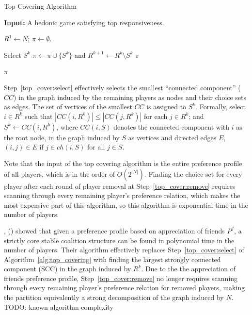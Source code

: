 \documentclass[letterpaper]{article} %
\newcommand{\citename}[1]{\citeauthor{#1}, (\citeyear{#1})}
\theoremstyle{definition}
\begin{document}
\begin{algorithm}[htb]
  \caption{Top Covering Algorithm}
  \label{alg:top_covering}
  \textbf{Input:} A hedonic game satisfying top responsiveness.

  \begin{algorithmic}[1]
  \State $R^1 \leftarrow N$; $\pi \leftarrow \emptyset$.

    \State \label{top_cover:select} Select $S^k$
    \State \label{top_cover:remove} $\pi \leftarrow \pi \cup \lbrace S^k \rbrace$ and $R^{k+1} \leftarrow  R^k \setminus S^k$
      \State \Return $\pi$
    \EndIf
  \EndFor

  \State \Return $\pi$
 \end{algorithmic}
\end{algorithm}

Step~\ref{top_cover:select} effectively selects the smallest ``connected component'' ($CC$) in the graph induced by the remaining players as nodes and their choice sets as edges. The set of vertices of the smallest $CC$ is assigned to $S^k$. Formally, select $i\in R^k$ such that $|CC(i,R^k)| \leq |CC(j,R^k)|$ for each $j\in R^k$; and $S^k\leftarrow CC(i,R^k)$, where $CC(i, S)$ denotes the connected component with $i$ as the root node, in the graph induced by $S$ as vertices and directed edges $E$, $(i, j) \in E$ if $j \in ch(i, S)$ for all $j \in S$.

Note that the input of the top covering algorithm is the entire preference profile of all players, which is in the order of $O(2^{|N|})$. Finding the choice set for every player after each round of player removal at Step~\ref{top_cover:remove} requires scanning through every remaining player's preference relation, which makes the most expensive part of this algorithm, so this algorithm is exponential time in the number of players.

\citename{Dimitrov2006} showed that given a preference profile based on appreciation of friends $P^f$, a strictly core stable coalition structure can be found in polynomial time in the number of players. Their algorithm effectively replaces Step~\ref{top_cover:select} of Algorithm~\ref{alg:top_covering} with finding the largest strongly connected component (SCC) in the graph induced by $R^k$. Due to the the appreciation of friends preference profile, Step~\ref{top_cover:remove} no longer requires scanning through every remaining player's preference relation for removed players, making the partition equivalently a strong decomposition of the graph induced by $N$. TODO: known algorithm complexity
\end{document}
